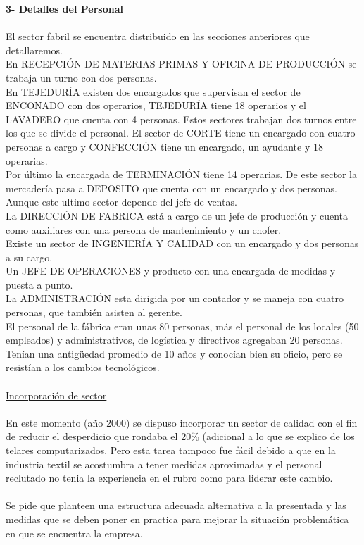 \documentclass[a4paper,10pt,titlepage]{article}
\begin{document}
	 \textbf{3- Detalles del Personal}\\ \\
			\indent El sector fabril se encuentra distribuido en las secciones anteriores que detallaremos.\\
			\indent En RECEPCIÓN DE MATERIAS PRIMAS Y OFICINA DE PRODUCCIÓN se trabaja un turno con dos personas.\\
			\indent En TEJEDURÍA existen dos encargados que supervisan el sector de ENCONADO con dos operarios, TEJEDURÍA tiene 18 operarios y el LAVADERO que cuenta con 4 personas. Estos sectores trabajan dos turnos entre los que se divide el personal. El sector de CORTE tiene un encargado con cuatro personas a cargo y CONFECCIÓN tiene un encargado, un ayudante y 18 operarias.\\ 
			\indent Por \'ultimo la encargada de TERMINACIÓN tiene 14 operarias. De este sector la mercader\'ia pasa a DEPOSITO que cuenta con un encargado y dos personas. Aunque este ultimo sector depende del jefe de ventas.\\
			\indent La DIRECCIÓN DE FABRICA est\'a a cargo de un jefe de producci\'on y cuenta como auxiliares con una persona de mantenimiento y un chofer.\\
			\indent Existe un sector de INGENIERÍA Y CALIDAD con un encargado y dos personas a su cargo.\\
			\indent Un JEFE DE OPERACIONES y producto con una encargada de medidas y puesta a punto.\\
			\indent La ADMINISTRACIÓN esta dirigida por un contador y se maneja con cuatro personas, que tambi\'en asisten al gerente.\\
			\indent El personal de la f\'abrica eran unas 80 personas, m\'as el personal de los locales (50 empleados) y administrativos, de log\'istica y directivos agregaban 20 personas. Ten\'ian una antigüedad promedio de 10 años y conoc\'ian bien su oficio, pero se resist\'ian a los cambios tecnol\'ogicos.\\\\
			\underline{Incorporaci\'on de sector}\\\\
			\indent En este momento (año 2000) se dispuso incorporar un sector de calidad con el fin de reducir el desperdicio que rondaba el 20\% (adicional a lo que se explico de los telares computarizados. Pero esta tarea tampoco fue f\'acil debido a que en la industria textil se acostumbra a tener medidas aproximadas y el personal reclutado no tenia la experiencia en el rubro como para liderar este cambio.\\ \\
			\indent \underline{Se pide} que planteen una estructura adecuada alternativa a la presentada y las medidas que se deben poner en practica para mejorar la situaci\'on problem\'atica en que se encuentra la empresa.\\
\end{document}
